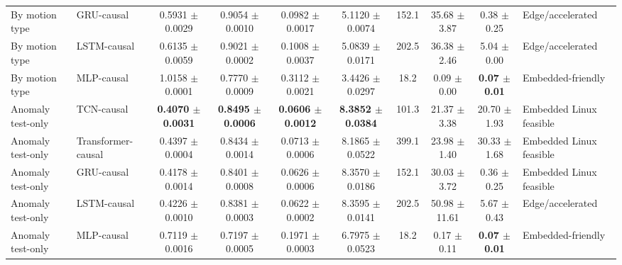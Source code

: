 \begin{table}[t]
{\begin{tabular}{llcccccccl}
By motion type & GRU-causal & 0.5931 $\pm$ 0.0029 & 0.9054 $\pm$ 0.0010 & 0.0982 $\pm$ 0.0017 & 5.1120 $\pm$ 0.0074 & 152.1 & 35.68 $\pm$ 3.87 & 0.38 $\pm$ 0.25 & Edge/accelerated \\
By motion type & LSTM-causal & 0.6135 $\pm$ 0.0059 & 0.9021 $\pm$ 0.0002 & 0.1008 $\pm$ 0.0037 & 5.0839 $\pm$ 0.0171 & 202.5 & 36.38 $\pm$ 2.46 & 5.04 $\pm$ 0.00 & Edge/accelerated \\
By motion type & MLP-causal & 1.0158 $\pm$ 0.0001 & 0.7770 $\pm$ 0.0009 & 0.3112 $\pm$ 0.0021 & 3.4426 $\pm$ 0.0297 & 18.2 & 0.09 $\pm$ 0.00 & \textbf{0.07 $\pm$ 0.01} & Embedded-friendly \\
\midrule
Anomaly test-only & TCN-causal & \textbf{0.4070 $\pm$ 0.0031} & \textbf{0.8495 $\pm$ 0.0006} & \textbf{0.0606 $\pm$ 0.0012} & \textbf{8.3852 $\pm$ 0.0384} & 101.3 & 21.37 $\pm$ 3.38 & 20.70 $\pm$ 1.93 & Embedded Linux feasible \\
Anomaly test-only & Transformer-causal & 0.4397 $\pm$ 0.0004 & 0.8434 $\pm$ 0.0014 & 0.0713 $\pm$ 0.0006 & 8.1865 $\pm$ 0.0522 & 399.1 & 23.98 $\pm$ 1.40 & 30.33 $\pm$ 1.68 & Embedded Linux feasible \\
Anomaly test-only & GRU-causal & 0.4178 $\pm$ 0.0014 & 0.8401 $\pm$ 0.0008 & 0.0626 $\pm$ 0.0006 & 8.3570 $\pm$ 0.0186 & 152.1 & 30.03 $\pm$ 3.72 & 0.36 $\pm$ 0.25 & Embedded Linux feasible \\
Anomaly test-only & LSTM-causal & 0.4226 $\pm$ 0.0010 & 0.8381 $\pm$ 0.0003 & 0.0622 $\pm$ 0.0002 & 8.3595 $\pm$ 0.0141 & 202.5 & 50.98 $\pm$ 11.61 & 5.67 $\pm$ 0.43 & Edge/accelerated \\
Anomaly test-only & MLP-causal & 0.7119 $\pm$ 0.0016 & 0.7197 $\pm$ 0.0005 & 0.1971 $\pm$ 0.0003 & 6.7975 $\pm$ 0.0523 & 18.2 & 0.17 $\pm$ 0.11 & \textbf{0.07 $\pm$ 0.01} & Embedded-friendly \\
\bottomrule
\end{tabular}%
}
\end{table}
